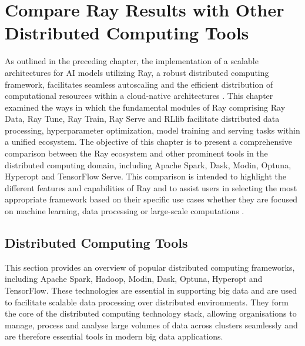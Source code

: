 \chapter{Compare Ray Results with Other Distributed Computing Tools}

\vspace{0.3cm}
As outlined in the preceding chapter, the implementation of a scalable architectures for AI models utilizing Ray, a robust distributed computing framework, facilitates seamless autoscaling and the efficient distribution of computational resources within a cloud-native architectures \cite{moritz}. This chapter examined the ways in which the fundamental modules of Ray comprising Ray Data, Ray Tune, Ray Train, Ray Serve and RLlib facilitate distributed data processing, hyperparameter optimization, model training and serving tasks within a unified ecosystem. The objective of this chapter is to present a comprehensive comparison between the Ray ecosystem and other prominent tools in the distributed computing domain, including Apache Spark, Dask, Modin, Optuna, Hyperopt and TensorFlow Serve. This comparison is intended to highlight the different features and capabilities of Ray and to assist users in selecting the most appropriate framework based on their specific use cases whether they are focused on machine learning, data processing or large-scale computations \cite{ray_doc}.

\section{Distributed Computing Tools}


This section provides an overview of popular distributed computing frameworks, including Apache Spark, Hadoop, Modin, Dask, Optuna, Hyperopt and TensorFlow. These technologies are essential in supporting big data and are used to facilitate scalable data processing over distributed environments. They form the core of the distributed computing technology stack, allowing organisations to manage, process and analyse large volumes of data across clusters seamlessly and are therefore essential tools in modern big data applications.
 \cite{sun2023survey}


